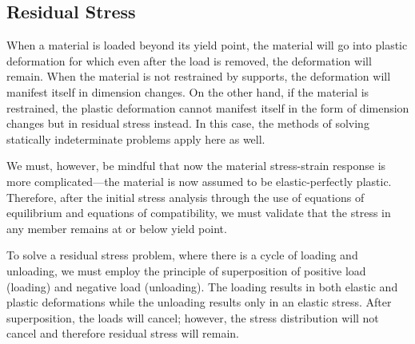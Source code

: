 \documentclass[
fontsize=10pt,
a4paper,
twosides=false,
open=any,
svgnames,
]{kaobook} %
\begin{document}
\subsection{Residual Stress}

When a material is loaded beyond its yield point, the material will go into plastic deformation for which even after the load is removed, the deformation will remain. When the material is not restrained by supports, the deformation will manifest itself in dimension changes. On the other hand, if the material is restrained, the plastic deformation cannot manifest itself in the form of dimension changes but in residual stress instead. In this case, the methods of solving statically indeterminate problems apply here as well.

We must, however, be mindful that now the material stress-strain response is more complicated—the material is now assumed to be elastic-perfectly plastic. Therefore, after the initial stress analysis through the use of equations of equilibrium and equations of compatibility, we must validate that the stress in any member remains at or below yield point.

To solve a residual stress problem, where there is a cycle of loading and unloading, we must employ the principle of superposition of positive load (loading) and negative load (unloading). The loading results in both elastic and plastic deformations while the unloading results only in an elastic stress. After superposition, the loads will cancel; however, the stress distribution will not cancel and therefore residual stress will remain.
\end{document}
